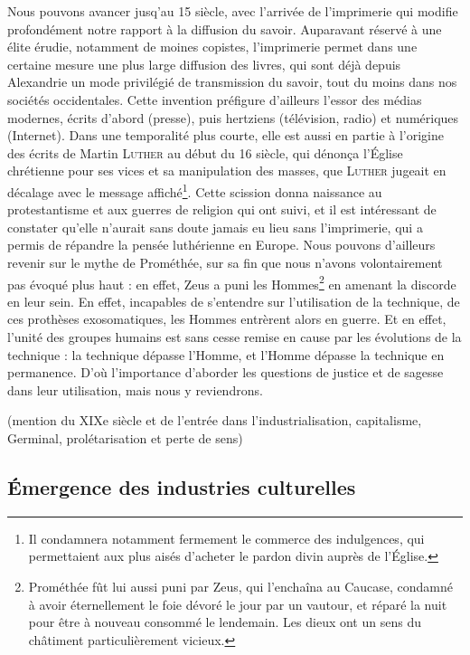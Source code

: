 \documentclass[a4paper,12pt]{report}
\begin{document}
Nous pouvons avancer jusq'au 15 siècle, avec l'arrivée de l'imprimerie qui modifie profondément notre rapport à la diffusion du savoir. Auparavant réservé à une élite érudie, notamment de moines copistes, l'imprimerie permet dans une certaine mesure une plus large diffusion des livres, qui sont déjà depuis Alexandrie un mode privilégié de transmission du savoir, tout du moins dans nos sociétés occidentales. Cette invention préfigure d'ailleurs l'essor des médias modernes, écrits d'abord (presse), puis hertziens (télévision, radio) et numériques (Internet). Dans une temporalité plus courte, elle est aussi en partie à l'origine des écrits de Martin \textsc{Luther} au début du 16 siècle, qui dénonça l'Église chrétienne pour ses vices et sa manipulation des masses, que \textsc{Luther} jugeait en décalage avec le message affiché\footnote{Il condamnera notamment fermement le commerce des indulgences, qui permettaient aux plus aisés d'acheter le pardon divin auprès de l'Église.}. Cette scission donna naissance au protestantisme et aux guerres de religion qui ont suivi, et il est intéressant de constater qu'elle n'aurait sans doute jamais eu lieu sans l'imprimerie, qui a permis de répandre la pensée luthérienne en Europe. Nous pouvons d'ailleurs revenir sur le mythe de Prométhée, sur sa fin que nous n'avons volontairement pas évoqué plus haut : en effet, Zeus a puni les Hommes\footnote{Prométhée fût lui aussi puni par Zeus, qui l'enchaîna au Caucase, condamné à avoir éternellement le foie dévoré le jour par un vautour, et réparé la nuit pour être à nouveau consommé le lendemain. Les dieux ont un sens du châtiment particulièrement vicieux.} en amenant la discorde en leur sein. En effet, incapables de s'entendre sur l'utilisation de la technique, de ces prothèses exosomatiques, les Hommes entrèrent alors en guerre. Et en effet, l'unité des groupes humains est sans cesse remise en cause par les évolutions de la technique : la technique dépasse l'Homme, et l'Homme dépasse la technique en permanence. D'où l'importance d'aborder les questions de justice et de sagesse dans leur utilisation, mais nous y reviendrons.

(mention du XIXe siècle et de l'entrée dans l'industrialisation, capitalisme, Germinal, prolétarisation et perte de sens)

\subsection{Émergence des industries culturelles}
\end{document}
